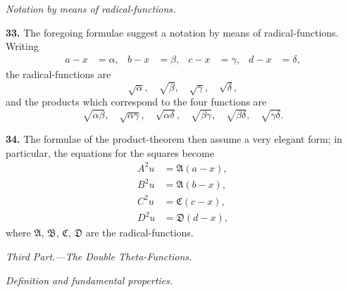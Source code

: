\documentclass[12pt,a4paper]{article}
\theoremstyle{definition}
\begin{document}
\vspace{1em}

\begin{center}
\textit{Notation by means of radical-functions.}
\end{center}

\vspace{0.5em}

\noindent\textbf{33.}\quad
The foregoing formulae suggest a notation by means of radical-functions. Writing
\begin{align*}
a - x &= \alpha, & b - x &= \beta, & c - x &= \gamma, & d - x &= \delta,
\end{align*}
the radical-functions are
\[
\sqrt{\alpha},\quad \sqrt{\beta},\quad \sqrt{\gamma},\quad \sqrt{\delta},
\]
and the products which correspond to the four functions are
\[
\sqrt{\alpha\beta},\quad \sqrt{\alpha\gamma},\quad \sqrt{\alpha\delta},\quad \sqrt{\beta\gamma},\quad \sqrt{\beta\delta},\quad \sqrt{\gamma\delta}.
\]

\noindent\textbf{34.}\quad
The formulae of the product-theorem then assume a very elegant form; in particular, the equations for the squares become
\begin{align*}
A^2 u &= \mathfrak{A}(a - x), \\
B^2 u &= \mathfrak{A}(b - x), \\
C^2 u &= \mathfrak{C}(c - x), \\
D^2 u &= \mathfrak{D}(d - x),
\end{align*}
where $\mathfrak{A}$, $\mathfrak{B}$, $\mathfrak{C}$, $\mathfrak{D}$ are the radical-functions.

\vspace{1em}

\begin{center}
\textit{Third Part.---The Double Theta-Functions.}
\end{center}

\vspace{0.5em}

\begin{center}
\textit{Definition and fundamental properties.}
\end{center}

\vspace{0.5em}
\end{document}
